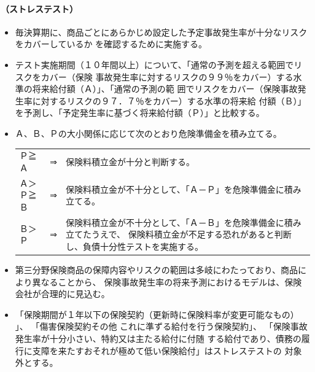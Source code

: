 \documentclass[report,gutter=10mm,fore-edge=10mm,uplatex,dvipdfmx]{jlreq}
\begin{document}
\paragraph{（ストレステスト）}
\begin{itemize}
 \item 毎決算期に、商品ごとにあらかじめ設定した予定事故発生率が十分なリスクをカバーしているか
を確認するために実施する。
 \item テスト実施期間（１０年間以上）について、「通常の予測を超える範囲でリスクをカバー（保険
事故発生率に対するリスクの９９％をカバー）する水準の将来給付額（Ａ）」、「通常の予測の範
囲でリスクをカバー（保険事故発生率に対するリスクの９７．７％をカバー）する水準の将来給
付額（Ｂ）」を予測し、「予定発生率に基づく将来給付額（Ｐ）」と比較する。
 \item Ａ、Ｂ、Ｐの大小関係に応じて次のとおり危険準備金を積み立てる。
\begin{tabular}{lcl}
Ｐ≧Ａ&⇒&保険料積立金が十分と判断する。\\
Ａ＞Ｐ≧Ｂ &⇒&保険料積立金が不十分として、「Ａ－Ｐ」を危険準備金に積み立てる。\\
Ｂ＞Ｐ&⇒&保険料積立金が不十分として、「Ａ－Ｂ」を危険準備金に積み立てたうえで、
保険料積立金が不足する恐れがあると判断し、負債十分性テストを実施する。\\
\end{tabular}
 \item 第三分野保険商品の保障内容やリスクの範囲は多岐にわたっており、商品により異なることから、
保険事故発生率の将来予測におけるモデルは、保険会社が合理的に見込む。
 \item 「保険期間が１年以下の保険契約（更新時に保険料率が変更可能なもの）
」、
「傷害保険契約その他
これに準ずる給付を行う保険契約」、
「保険事故発生率が十分小さい、特約又は主たる給付に付随
する給付であり、債務の履行に支障を来たすおそれが極めて低い保険給付」はストレステストの
対象外とする。
\end{itemize}
\end{document}

